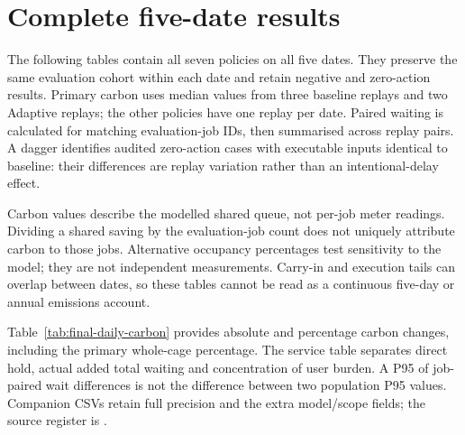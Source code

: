 \chapter{Complete five-date results}\label{app:daily-results}
The following tables contain all seven policies on all five dates. They preserve the same evaluation cohort within each date and retain negative and zero-action results. Primary carbon uses median values from three baseline replays and two Adaptive replays; the other policies have one replay per date. Paired waiting is calculated for matching evaluation-job IDs, then summarised across replay pairs. A dagger identifies audited zero-action cases with executable inputs identical to baseline: their differences are replay variation rather than an intentional-delay effect.

Carbon values describe the modelled shared queue, not per-job meter readings. Dividing a shared saving by the evaluation-job count does not uniquely attribute carbon to those jobs. Alternative occupancy percentages test sensitivity to the model; they are not independent measurements. Carry-in and execution tails can overlap between dates, so these tables cannot be read as a continuous five-day or annual emissions account.

Table~\ref{tab:final-daily-carbon} provides absolute and percentage carbon changes, including the primary whole-cage percentage. The service table separates direct hold, actual added total waiting and concentration of user burden. A P95 of job-paired wait differences is not the difference between two population P95 values. Companion CSVs retain full precision and the extra model/scope fields; the source register is .

\clearpage

